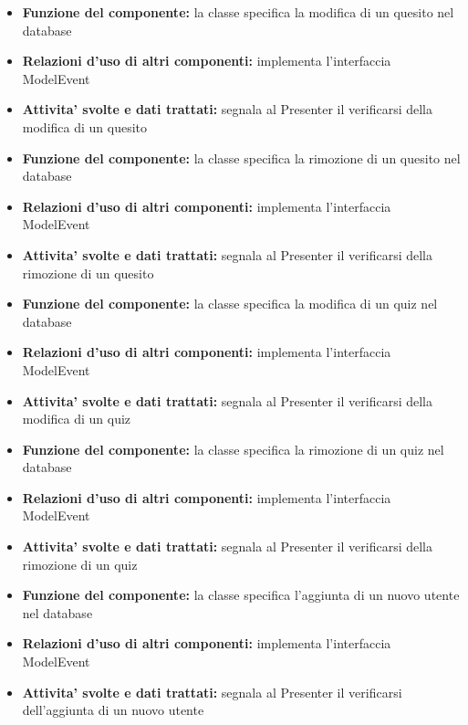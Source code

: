\documentclass[a4paper,11pt]{article}
\begin{document}
			\begin{itemize}
		    	\item\textbf{Funzione del componente:} la classe specifica la modifica di un quesito nel database
				\item\textbf{Relazioni d'uso di altri componenti:} implementa l'interfaccia ModelEvent
				\item\textbf{Attivita' svolte e dati trattati:} segnala al Presenter il verificarsi della modifica di un quesito
			\end{itemize}
			\begin{itemize}
		    	\item\textbf{Funzione del componente:} la classe specifica la rimozione di un quesito nel database
				\item\textbf{Relazioni d'uso di altri componenti:} implementa l'interfaccia ModelEvent
				\item\textbf{Attivita' svolte e dati trattati:} segnala al Presenter il verificarsi della rimozione di un quesito
			\end{itemize}
			\begin{itemize}
		    	\item\textbf{Funzione del componente:} la classe specifica la modifica di un quiz nel database
				\item\textbf{Relazioni d'uso di altri componenti:} implementa l'interfaccia ModelEvent
				\item\textbf{Attivita' svolte e dati trattati:} segnala al Presenter il verificarsi della modifica di un quiz
			\end{itemize}
			\begin{itemize}
		    	\item\textbf{Funzione del componente:} la classe specifica la rimozione di un quiz nel database
				\item\textbf{Relazioni d'uso di altri componenti:} implementa l'interfaccia ModelEvent
				\item\textbf{Attivita' svolte e dati trattati:} segnala al Presenter il verificarsi della rimozione di un quiz
			\end{itemize}
			\begin{itemize}
		    	\item\textbf{Funzione del componente:} la classe specifica l'aggiunta di un nuovo utente nel database
				\item\textbf{Relazioni d'uso di altri componenti:} implementa l'interfaccia ModelEvent
				\item\textbf{Attivita' svolte e dati trattati:} segnala al Presenter il verificarsi dell'aggiunta di un nuovo utente
			\end{itemize}
\end{document}
